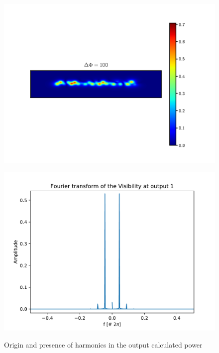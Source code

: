 \begin{figure}[htbp]
  \centering
  \begin{minipage}[b]{.45\textwidth}
    \centering
    \includegraphics[scale=.5]{../picture/phase_100.pdf}
    \label{fig:notcentered}
  \end{minipage}%
  \hspace{0.5 cm}
  \begin{minipage}[b]{.45\textwidth}
    \centering
    \includegraphics[scale=.5]{../picture/Fourier_1.pdf}
    \label{fig:harmonics}
  \end{minipage}
  \caption{Origin and presence of harmonics in the output calculated
    power}
\end{figure}


